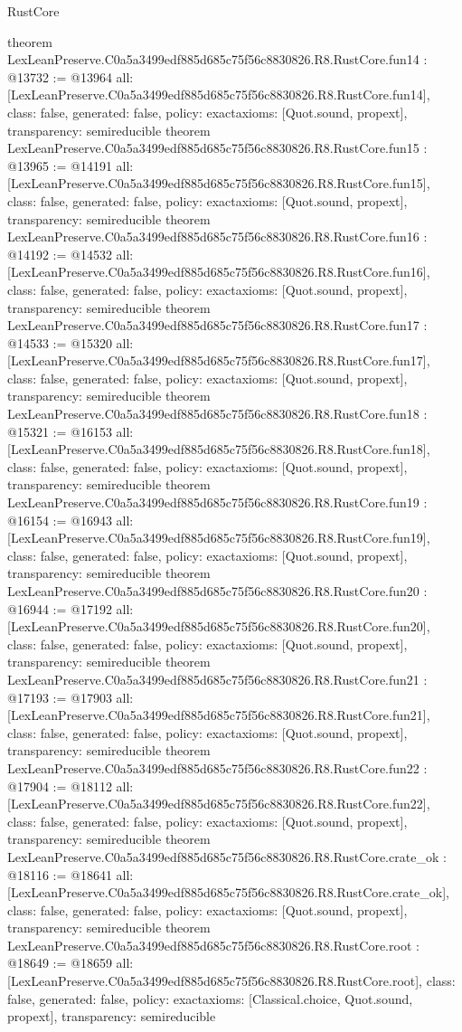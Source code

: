 \begin{lexlean}{RustCore}
\begin{coremodule}
{}
theorem LexLeanPreserve.C0a5a3499edf885d685c75f56c8830826.R8.RustCore.fun14 : @13732 := @13964 {
  all: [LexLeanPreserve.C0a5a3499edf885d685c75f56c8830826.R8.RustCore.fun14],
  class: false,
  generated: false,
  policy: exact{axioms: [Quot.sound, propext]},
  transparency: semireducible
}
theorem LexLeanPreserve.C0a5a3499edf885d685c75f56c8830826.R8.RustCore.fun15 : @13965 := @14191 {
  all: [LexLeanPreserve.C0a5a3499edf885d685c75f56c8830826.R8.RustCore.fun15],
  class: false,
  generated: false,
  policy: exact{axioms: [Quot.sound, propext]},
  transparency: semireducible
}
theorem LexLeanPreserve.C0a5a3499edf885d685c75f56c8830826.R8.RustCore.fun16 : @14192 := @14532 {
  all: [LexLeanPreserve.C0a5a3499edf885d685c75f56c8830826.R8.RustCore.fun16],
  class: false,
  generated: false,
  policy: exact{axioms: [Quot.sound, propext]},
  transparency: semireducible
}
theorem LexLeanPreserve.C0a5a3499edf885d685c75f56c8830826.R8.RustCore.fun17 : @14533 := @15320 {
  all: [LexLeanPreserve.C0a5a3499edf885d685c75f56c8830826.R8.RustCore.fun17],
  class: false,
  generated: false,
  policy: exact{axioms: [Quot.sound, propext]},
  transparency: semireducible
}
theorem LexLeanPreserve.C0a5a3499edf885d685c75f56c8830826.R8.RustCore.fun18 : @15321 := @16153 {
  all: [LexLeanPreserve.C0a5a3499edf885d685c75f56c8830826.R8.RustCore.fun18],
  class: false,
  generated: false,
  policy: exact{axioms: [Quot.sound, propext]},
  transparency: semireducible
}
theorem LexLeanPreserve.C0a5a3499edf885d685c75f56c8830826.R8.RustCore.fun19 : @16154 := @16943 {
  all: [LexLeanPreserve.C0a5a3499edf885d685c75f56c8830826.R8.RustCore.fun19],
  class: false,
  generated: false,
  policy: exact{axioms: [Quot.sound, propext]},
  transparency: semireducible
}
theorem LexLeanPreserve.C0a5a3499edf885d685c75f56c8830826.R8.RustCore.fun20 : @16944 := @17192 {
  all: [LexLeanPreserve.C0a5a3499edf885d685c75f56c8830826.R8.RustCore.fun20],
  class: false,
  generated: false,
  policy: exact{axioms: [Quot.sound, propext]},
  transparency: semireducible
}
theorem LexLeanPreserve.C0a5a3499edf885d685c75f56c8830826.R8.RustCore.fun21 : @17193 := @17903 {
  all: [LexLeanPreserve.C0a5a3499edf885d685c75f56c8830826.R8.RustCore.fun21],
  class: false,
  generated: false,
  policy: exact{axioms: [Quot.sound, propext]},
  transparency: semireducible
}
theorem LexLeanPreserve.C0a5a3499edf885d685c75f56c8830826.R8.RustCore.fun22 : @17904 := @18112 {
  all: [LexLeanPreserve.C0a5a3499edf885d685c75f56c8830826.R8.RustCore.fun22],
  class: false,
  generated: false,
  policy: exact{axioms: [Quot.sound, propext]},
  transparency: semireducible
}
theorem LexLeanPreserve.C0a5a3499edf885d685c75f56c8830826.R8.RustCore.crate_ok : @18116 := @18641 {
  all: [LexLeanPreserve.C0a5a3499edf885d685c75f56c8830826.R8.RustCore.crate_ok],
  class: false,
  generated: false,
  policy: exact{axioms: [Quot.sound, propext]},
  transparency: semireducible
}
theorem LexLeanPreserve.C0a5a3499edf885d685c75f56c8830826.R8.RustCore.root : @18649 := @18659 {
  all: [LexLeanPreserve.C0a5a3499edf885d685c75f56c8830826.R8.RustCore.root],
  class: false,
  generated: false,
  policy: exact{axioms: [Classical.choice, Quot.sound, propext]},
  transparency: semireducible
}


\end{coremodule}
\end{lexlean}
